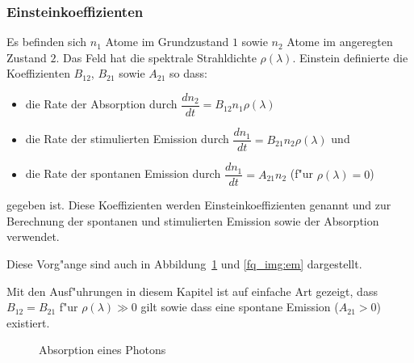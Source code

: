 \subsubsection{Einsteinkoeffizienten}
Es befinden sich $n_1$ Atome im Grundzustand $1$ sowie $n_2$ Atome im angeregten Zustand $2$. Das Feld hat die spektrale Strahldichte $\rho(\lambda)$. Einstein definierte die Koeffizienten $B_{12}$, $B_{21}$ sowie $A_{21}$ so dass:
\begin{itemize}
	\item die Rate der Absorption durch $\dfrac{dn_2}{dt} = B_{12} n_1 \rho(\lambda)$
	\item die Rate der stimulierten Emission durch $\dfrac{dn_1}{dt} = B_{21} n_2 \rho(\lambda)$ und
	\item die Rate der spontanen Emission durch $\dfrac{dn_1}{dt} = A_{21} n_2$ (f"ur $\rho(\lambda)=0$)
\end{itemize}
gegeben ist. Diese Koeffizienten werden Einsteinkoeffizienten \cite{fq:einstein_koeff} genannt und zur Berechnung der spontanen und stimulierten Emission sowie der Absorption verwendet.

Diese Vorg"ange sind auch in Abbildung~\ref{fq_img:abs} und \ref{fq_img:em} dargestellt.

Mit den Ausf"uhrungen in diesem Kapitel ist auf einfache Art gezeigt, dass $B_{12} = B_{21}$ f"ur $\rho(\lambda) \gg 0$ gilt sowie dass eine spontane Emission ($A_{21} > 0$) existiert.

\begin{figure}
	\centering
	\caption{Absorption eines Photons
		\label{fq_img:abs}}
\end{figure}

